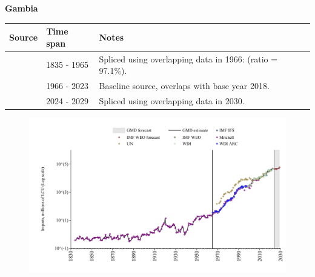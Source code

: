 \documentclass[12pt,a4paper,landscape]{article}
\begin{document}
\begin{adjustbox}{max totalsize={\paperwidth}{\paperheight},center}
\begin{minipage}[t][\textheight][t]{\textwidth}
\vspace*{0.5cm}
{}
\begin{center}
{\Large\bfseries Gambia}
\end{center}
\vspace{0.5cm}
\begin{table}[H]
\centering
\small
\begin{tabular}{|l|l|l|}
\hline
\textbf{Source} & \textbf{Time span} & \textbf{Notes} \\
\hline
\rowcolor{white}\cite{Mitchell}& 1835 - 1965 &Spliced using overlapping data in 1966: (ratio = 97.1\%).\\
\rowcolor{lightgray}\cite{WDI}& 1966 - 2023 &Baseline source, overlaps with base year 2018.\\
\rowcolor{white}\cite{IMF_WEO_forecast}& 2024 - 2029 &Spliced using overlapping data in 2030.\\
\hline
\end{tabular}
\end{table}
\begin{figure}[H]
\centering
\includegraphics[width=\textwidth,height=0.6\textheight,keepaspectratio]{graphs/GMB_imports.pdf}
\end{figure}
\end{minipage}
\end{adjustbox}
\end{document}
